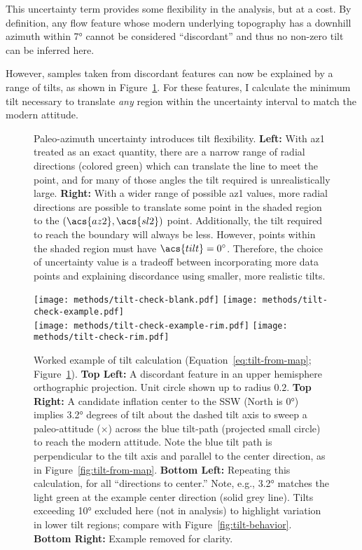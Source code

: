 This uncertainty term provides some flexibility in the analysis, but at a cost. By definition, any flow feature whose modern underlying topography has a downhill azimuth within \ang{7} cannot be considered ``discordant'' and thus no non-zero tilt can be inferred here.

However, samples taken from discordant features can now be explained by a range of tilts, as shown in Figure~\ref{fig:az1-uncertainty}. For these features, I calculate the minimum tilt necessary to translate \emph{any} region within the uncertainty interval to match the modern attitude.

\begin{figure}
    \caption[Paleo-azimuth uncertainty]{Paleo-azimuth uncertainty introduces tilt flexibility. \textbf{Left:} With \acs{az1} treated as an exact quantity, there are a narrow range of radial directions (colored green) which can translate the line to meet the point, and for many of those angles the tilt required is unrealistically large. \textbf{Right:} With a wider range of possible \acs{az1} values, more radial directions are possible to translate some point in the shaded region to the $(\acs{az2},\acs{sl2})$ point. Additionally, the tilt required to reach the boundary will always be less. However, points within the shaded region must have $\acs{tilt}=\ang{0}$. Therefore, the choice of uncertainty value is a tradeoff between incorporating more data points and explaining discordance using smaller, more realistic tilts.}%
    \label{fig:az1-uncertainty}
\end{figure}

\begin{figure}
    \vspace{-19pt}
    \texttt{[image: methods/tilt-check-blank.pdf]}%
    \texttt{[image: methods/tilt-check-example.pdf]}\\
    \texttt{[image: methods/tilt-check-example-rim.pdf]}%
    \texttt{[image: methods/tilt-check-rim.pdf]}%
    \caption[Tilt calculation example]{Worked example of tilt calculation (Equation~\eqref{eq:tilt-from-map}; Figure~\ref{fig:az1-uncertainty}). \textbf{Top Left:} A discordant feature in an upper hemisphere orthographic projection. Unit circle shown up to radius $0.2$. \textbf{Top Right:} A candidate inflation center to the SSW (North is \ang{0}) implies \ang{+3.2} degrees of tilt about the dashed tilt axis to sweep a paleo-attitude ($\times$) across the blue tilt-path (projected small circle) to reach the modern attitude. Note the blue tilt path is perpendicular to the tilt axis and parallel to the center direction, as in Figure~\ref{fig:tilt-from-map}. \textbf{Bottom Left:} Repeating this calculation, for all ``directions to center.'' Note, e.g., \ang{3.2} matches the light green at the example center direction (solid grey line). Tilts exceeding \ang{10} excluded here (not in analysis) to highlight variation in lower tilt regions; compare with Figure~\ref{fig:tilt-behavior}. \textbf{Bottom Right:} Example removed for clarity.}
    \label{fig:tilt-example}
\end{figure}

